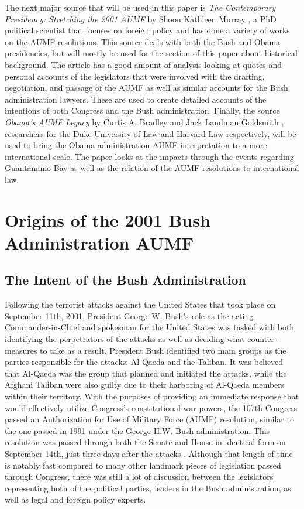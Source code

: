\documentclass[12pt]{article}
\begin{document}
The next major source that will be used in this paper is \textit{The Contemporary Presidency: Stretching the 2001 AUMF} by Shoon Kathleen Murray \autocite{murray2015}, a PhD political scientist that focuses on foreign policy and has done a variety of works on the AUMF resolutions.
This source deals with both the Bush and Obama presidencies, but will mostly be used for the section of this paper about historical background.
The article has a good amount of analysis looking at quotes and personal accounts of the legislators that were involved with the drafting, negotiation, and passage of the AUMF as well as similar accounts for the Bush administration lawyers.
These are used to create detailed accounts of the intentions of both Congress and the Bush administration.
Finally, the source \textit{Obama's AUMF Legacy} by Curtis A. Bradley and Jack Landman Goldsmith \autocite{bradley2016}, researchers for the Duke University of Law and Harvard Law respectively, will be used to bring the Obama administration AUMF interpretation to a more international scale.
The paper looks at the impacts through the events regarding Guantanamo Bay as well as the relation of the AUMF resolutions to international law.

\section*{Origins of the 2001 Bush Administration AUMF}
\subsection*{The Intent of the Bush Administration}
Following the terrorist attacks against the United States that took place on September 11th, 2001, President George W. Bush's role as the acting Commander-in-Chief and spokesman for the United States was tasked with both identifying the perpetrators of the attacks as well as deciding what counter-measures to take as a result.
President Bush identified two main groups as the parties responsible for the attacks: Al-Qaeda and the Taliban.
It was believed that Al-Qaeda was the group that planned and initiated the attacks, while the Afghani Taliban were also guilty due to their harboring of Al-Qaeda members within their territory.
With the purposes of providing an immediate response that would effectively utilize Congress's constitutional war powers, the 107th Congress passed an Authorization for Use of Military Force (AUMF) resolution, similar to the one passed in 1991 under the George H.W. Bush administration.
This resolution was passed through both the Senate and House in identical form on September 14th, just three days after the attacks \autocite{zotero-165}.
Although that length of time is notably fast compared to many other landmark pieces of legislation passed through Congress, there was still a lot of discussion between the legislators representing both of the political parties, leaders in the Bush administration, as well as legal and foreign policy experts.
\end{document}

